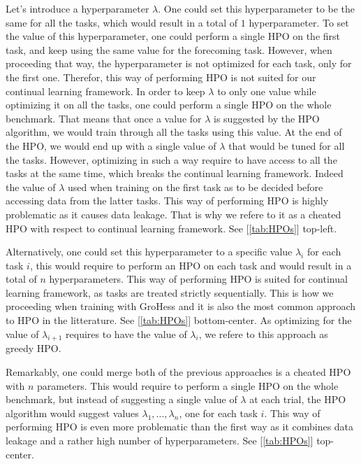 \documentclass[11pt]{article}
\begin{document}
\vspace{1mm}
\noindent
Let's introduce a hyperparameter $\lambda$. One could set this hyperparameter to be the same for all the tasks, which would result in a total of $1$ hyperparameter. To set the value of this hyperparameter, one could perform a single HPO on the first task, and keep using the same value for the forecoming task. However, when proceeding that way, the hyperparameter is not optimized for each task, only for the first one. Therefor, this way of performing HPO is not suited for our continual learning framework. In order to keep $\lambda$ to only one value while optimizing it on all the tasks, one could perform a single HPO on the whole benchmark. That means that once a value for $\lambda$ is suggested by the HPO algorithm, we would train through all the tasks using this value. At the end of the HPO, we would end up with a single value of $\lambda$ that would be tuned for all the tasks. However, optimizing in such a way require to have access to all the tasks at the same time, which breaks the continual learning framework. Indeed the value of $\lambda$ used when training on the first task as to be decided before accessing data from the latter tasks. This way of performing HPO is highly problematic as it causes data leakage. That is why we refere to it as a cheated HPO with respect to continual learning framework. See [\ref{tab:HPOs}] top-left.

\vspace{1mm}
\noindent
Alternatively, one could set this hyperparameter to a specific value $\lambda_i$ for each task $i$, this would require to perform an HPO on each task and would result in a total of $n$ hyperparameters. This way of performing HPO is suited for continual learning framework, as tasks are treated strictly sequentially. This is how we proceeding when training with GroHess and it is also the most common approach to HPO in the litterature. See [\ref{tab:HPOs}] bottom-center. As optimizing for the value of $\lambda_{i+1}$ requires to have the value of $\lambda_i$, we refere to this approach as greedy HPO.

\vspace{1mm}
\noindent
Remarkably, one could merge both of the previous approaches is a cheated HPO with $n$ parameters. This would require to perform a single HPO on the whole benchmark, but instead of suggesting a single value of $\lambda$ at each trial, the HPO algorithm would suggest values $\lambda_1,...,\lambda_n$, one for each task $i$. This way of performing HPO is even more problematic than the first way as it combines data leakage and a rather high number of hyperparameters. See [\ref{tab:HPOs}] top-center.
\end{document}
